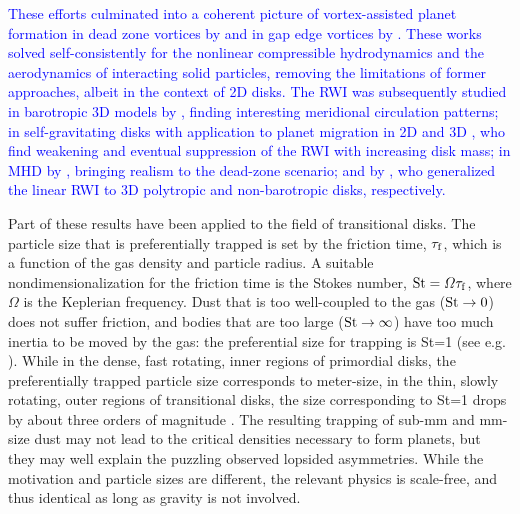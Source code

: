 \documentclass[apj]{emulateapj}
\def\blue#1{\textcolor{blue}{ #1}}
\newcommand{\tauf}{\tau_{\rm f}}
\newcommand{\St}{{\rm St}}
\begin{document}
\blue{These efforts culminated into a coherent picture of vortex-assisted
planet formation in dead zone vortices by \citet{Lyra08,Lyra09a} and in 
gap edge vortices by \citet{Lyra09b}. These works solved
self-consistently for the nonlinear compressible hydrodynamics and the
aerodynamics of interacting solid particles, removing the limitations
of former approaches, albeit in the context of 2D disks. The RWI was subsequently studied in barotropic 3D
models by \citet{Meheut10,Meheut12a,Meheut12b}, finding interesting
meridional circulation patterns; in self-gravitating disks with application to 
planet migration in 2D \citep{Lin-Papaloizou10,Lin-Papaloizou11a,Lin-Papaloizou11b,Lin-Papaloizou12}
and 3D \citep{Lin12b}, who find weakening and eventual suppression of the RWI with
increasing disk mass; in MHD by \citet{Lyra-MacLow12}, bringing realism to the dead-zone 
scenario; and by \citet{Lin12, Lin13}, who generalized the linear RWI 
to 3D polytropic and non-barotropic disks, respectively. } 

Part of these results have been applied to the field of
transitional disks. The particle size that is
preferentially trapped is set by the friction time, $\tauf$, which is a
function of the gas density and particle radius. A suitable nondimensionalization for the
friction time is the Stokes number, $\St = \varOmega \tauf$,
where $\varOmega$ is the Keplerian frequency. Dust that is too
well-coupled to the gas ($\St\rightarrow 0$) does not suffer friction, and bodies
that are too large ($\St\rightarrow \infty$) have too much inertia to be moved by the
gas: the preferential size for trapping is \St=1 (see e.g. \citealt{Youdin-Goodman05,Youdin08}).
While in the dense, fast rotating, inner regions of primordial disks, 
the preferentially trapped particle size corresponds to meter-size, in
the thin, slowly rotating, outer regions of transitional
disks, the size corresponding to \St=1 drops by about three orders of
magnitude \citep{Brauer07,Pinilla12a}. The resulting trapping of sub-mm and mm-size dust may not
lead to the critical densities necessary to form planets, but they may
well explain the puzzling observed lopsided asymmetries. While the 
motivation and particle sizes are different, the relevant physics 
is scale-free, and thus identical as long as gravity is not involved. 
\end{document}
